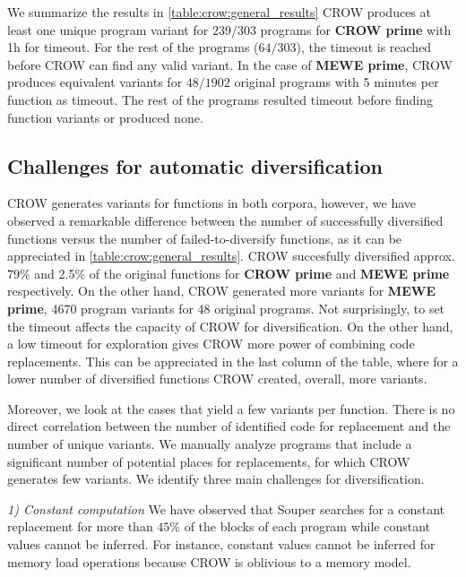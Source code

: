 We summarize the results in \autoref{table:crow:general_results}
CROW produces at least one unique program variant for $239/303{}$ programs for \textbf{CROW prime} with 1h for timeout. For the rest of the programs ($64/303{}$), the timeout is reached before CROW can find any valid variant. 
In the case of \textbf{MEWE prime}, CROW produces equivalent variants for $48/1902$ original programs with 5 minutes per function as timeout. The rest of the programs resulted timeout before finding function variants or produced none.




\subsection{Challenges for automatic diversification}

CROW generates variants for functions in both corpora, however, we have observed a remarkable difference between the number of successfully diversified functions versus the number of failed-to-diversify functions, as it can be appreciated in \autoref{table:crow:general_results}. CROW succesfully diversified approx. 79\% and 2.5\% of the original functions for \textbf{CROW prime} and  \textbf{MEWE prime} respectively. On the other hand, CROW generated more variants for \textbf{MEWE prime}, 4670 program variants for 48 original programs. Not surprisingly, to set the timeout affects the capacity of CROW for diversification. On the other hand, a low timeout for exploration gives CROW more power of combining code replacements. This can be appreciated in the last column of the table, where for a lower number of diversified functions CROW created, overall, more variants.


Moreover, we look at the cases that yield a few variants per function. There is no direct correlation between the number of identified code for replacement and the number of unique variants. We manually analyze programs that include a significant number of potential places for replacements, for which CROW generates few variants. 
We identify three main challenges for diversification.

\emph{1) Constant computation}  We have observed that Souper searches for a constant replacement for more than $45\%$ of the blocks of each program while constant values cannot be inferred. For instance,  constant values cannot be inferred for memory load operations because CROW is oblivious to a memory model. 

